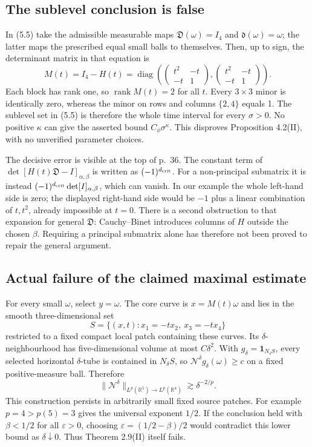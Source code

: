 \documentclass[10pt]{article}
\begin{document}
\subsection*{The sublevel conclusion is false}
In (5.5) take the admissible measurable maps \(\mathfrak D(\omega)=I_4\) and \(\mathfrak d(\omega)=\omega\); the latter maps the prescribed equal small balls to themselves. Then, up to sign, the determinant matrix in that equation is \[M(t)=I_4-H(t)
 =\operatorname{diag}\left(
 \begin{pmatrix}t^2&-t\\-t&1\end{pmatrix},
 \begin{pmatrix}t^2&-t\\-t&1\end{pmatrix}\right).\] Each block has rank one, so \(\operatorname{rank}M(t)=2\) for all \(t\). Every \(3\times3\) minor is identically zero, whereas the minor on rows and columns \(\{2,4\}\) equals 1. The sublevel set in (5.5) is therefore the whole time interval for every \(\sigma>0\). No positive \(\kappa\) can give the asserted bound \(C_\phi\sigma^\kappa\). This disproves Proposition 4.2(II), with no unverified parameter choices.\par
The decisive error is visible at the top of p. 36. The constant term of \(\det[H(t)\mathfrak D-I]_{\alpha,\beta}\) is written as \((-1)^{d_{\rm crit}}\). For a non-principal submatrix it is instead \((-1)^{d_{\rm crit}}\det[I]_{\alpha,\beta}\), which can vanish. In our example the whole left-hand side is zero; the displayed right-hand side would be \(-1\) plus a linear combination of \(t,t^2\), already impossible at \(t=0\). There is a second obstruction to that expansion for general \(\mathfrak D\): Cauchy–Binet introduces columns of \(H\) outside the chosen \(\beta\). Requiring a principal submatrix alone has therefore not been proved to repair the general argument.\par
\subsection*{Actual failure of the claimed maximal estimate}
For every small \(\omega\), select \(y=\omega\). The core curve is \(x=M(t)\omega\) and lies in the smooth three-dimensional set \[S=\{(x,t):x_1=-t x_2,\ x_3=-t x_4\}\] restricted to a fixed compact local patch containing these curves. Its \(\delta\)-neighbourhood has five-dimensional volume at most \(C\delta^2\). With \(g_\delta=\mathbf1_{N_\delta S}\), every selected horizontal \(\delta\)-tube is contained in \(N_\delta S\), so \(\mathcal N^\delta g_\delta(\omega)\geq c\) on a fixed positive-measure ball. Therefore \[\|\mathcal N^\delta\|_{L^p(\mathbb R^5)\to L^p(\mathbb R^4)}
 \gtrsim \delta^{-2/p}.\] This construction persists in arbitrarily small fixed source patches. For example \(p=4>p(5)=3\) gives the universal exponent \(1/2\). If the conclusion held with \(\beta<1/2\) for all \(\varepsilon>0\), choosing \(\varepsilon=(1/2-\beta)/2\) would contradict this lower bound as \(\delta\downarrow0\). Thus Theorem 2.9(II) itself fails.\par
\end{document}
